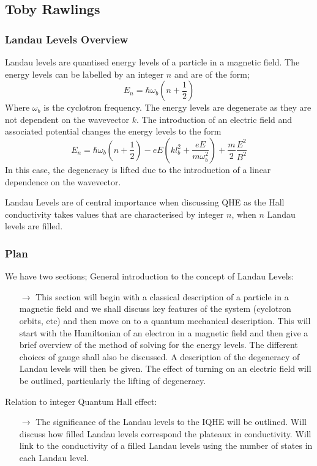 \documentclass[12pt]{article}
\newcommand{\PRLsep}{\noindent\makebox[\linewidth]{\resizebox{0.3333\linewidth}{1pt}{$\bullet$}}\bigskip}
\begin{document}
\vspace{0.5cm}
\PRLsep


\newpage
\subsection*{Toby Rawlings}

\subsubsection*{Landau Levels Overview}

Landau levels are quantised energy levels of a particle in a magnetic field. The energy levels can be labelled by an integer $n$ and are of the form;
\begin{equation*}
    E_n = \hbar \omega_{b}\left(n + \frac{1}{2}\right)
\end{equation*}
Where $\omega_{b}$ is the cyclotron frequency. The energy levels are degenerate as they are not dependent on the wavevector $k$. The introduction of an electric
field and associated potential changes the energy levels to the form
\begin{equation*}
    E_n = \hbar \omega_{b}\left(n + \frac{1}{2}\right) - eE\left(k l_b^2 + \frac{eE}{m\omega_{b}^2}\right) + \frac{m}{2}\frac{E^2}{B^2}
\end{equation*}
In this case, the degeneracy is lifted due to the introduction of a linear dependence on the wavevector.

\noindent Landau Levels are of central importance when discussing QHE as the Hall conductivity takes values that are characterised by integer $n$, when $n$ Landau levels are filled.

\subsubsection*{Plan}
We have two sections;
General introduction to the concept of Landau Levels:
\begin{enumerate}
    \item[$\to$] This section will begin with a classical description of a particle in a magnetic field and we shall discuss key features of the system (cyclotron orbits, etc) and then
        move on to a quantum mechanical description. This will start with the Hamiltonian of an electron in a magnetic field and then give a brief overview of the method of solving for the energy levels.
        The different choices of gauge shall also be discussed. A description of the degeneracy of Landau levels will then be given. The effect of turning on an electric field will be outlined, particularly the lifting of degeneracy.
\end{enumerate}
Relation to integer Quantum Hall effect:
\begin{enumerate}
    \item[$\to$] The significance of the Landau levels to the IQHE will be outlined. Will discuss how filled Landau levels correspond the
        plateaux in conductivity. Will link to the conductivity of a filled Landau levels using the number of states in each Landau level.
\end{enumerate}
\end{document}
